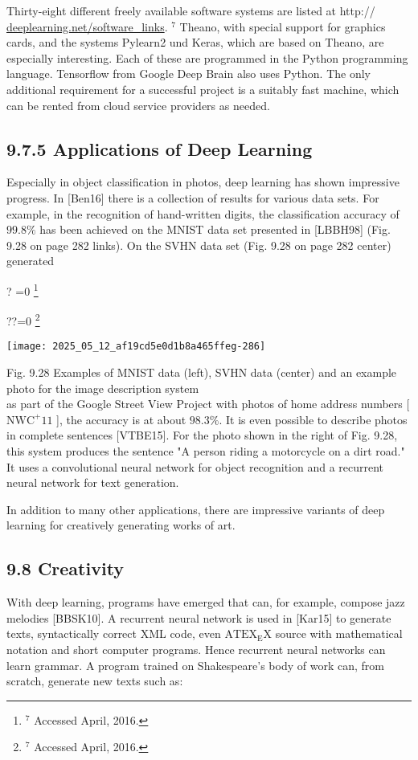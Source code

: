 \documentclass[10pt]{article}
\let\svthefootnote\thefootnote
\newcommand\blfootnotetext[1]{%
  \let\thefootnote\relax\footnote{#1}%
  \addtocounter{footnote}{-1}%
  \let\thefootnote\svthefootnote%
}
\let\svfootnotetext\footnotetext
\renewcommand\footnotetext[2][?]{%
  \if\relax#1\relax%
    \ifnum\value{footnote}=0\blfootnotetext{#2}\else\svfootnotetext{#2}\fi%
  \else%
    \if?#1\ifnum\value{footnote}=0\blfootnotetext{#2}\else\svfootnotetext{#2}\fi%
    \else\svfootnotetext[#1]{#2}\fi%
  \fi
}
\begin{document}
Thirty-eight different freely available software systems are listed at http:// \href{http://deeplearning.net/software_links}{deeplearning.net/software\_links}. ${ }^{7}$ Theano, with special support for graphics cards, and the systems Pylearn2 und Keras, which are based on Theano, are especially interesting. Each of these are programmed in the Python programming language. Tensorflow from Google Deep Brain also uses Python. The only additional requirement for a successful project is a suitably fast machine, which can be rented from cloud service providers as needed.

\subsection*{9.7.5 Applications of Deep Learning}
Especially in object classification in photos, deep learning has shown impressive progress. In [Ben16] there is a collection of results for various data sets. For example, in the recognition of hand-written digits, the classification accuracy of $99.8 \%$ has been achieved on the MNIST data set presented in [LBBH98] (Fig. 9.28 on page 282 links). On the SVHN data set (Fig. 9.28 on page 282 center) generated

\texttt{[image: 2025\_05\_12\_af19cd5e0d1b8a465ffeg-286]}

Fig. 9.28 Examples of MNIST data (left), SVHN data (center) and an example photo for the image description system\\
as part of the Google Street View Project with photos of home address numbers [ $\mathrm{NWC}^{+} 11$ ], the accuracy is at about $98.3 \%$. It is even possible to describe photos in complete sentences [VTBE15]. For the photo shown in the right of Fig. 9.28, this system produces the sentence "A person riding a motorcycle on a dirt road." It uses a convolutional neural network for object recognition and a recurrent neural network for text generation.

In addition to many other applications, there are impressive variants of deep learning for creatively generating works of art.

\subsection*{9.8 Creativity}
With deep learning, programs have emerged that can, for example, compose jazz melodies [BBSK10]. A recurrent neural network is used in [Kar15] to generate texts, syntactically correct XML code, even $\mathrm{ATEX}_{\mathrm{E}} \mathrm{X}$ source with mathematical notation and short computer programs. Hence recurrent neural networks can learn grammar. A program trained on Shakespeare's body of work can, from scratch, generate new texts such as:
\end{document}
